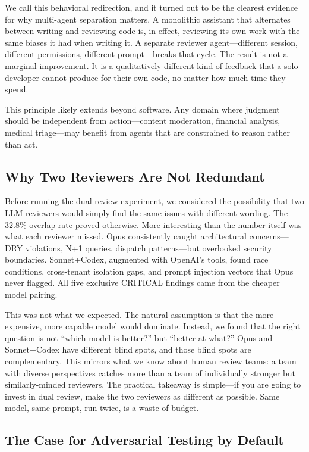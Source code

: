 \documentclass[11pt,a4paper]{article}
\begin{document}
We call this behavioral redirection, and it turned out to be the clearest evidence for why multi-agent separation matters. A monolithic assistant that alternates between writing and reviewing code is, in effect, reviewing its own work with the same biases it had when writing it. A separate reviewer agent---different session, different permissions, different prompt---breaks that cycle. The result is not a marginal improvement. It is a qualitatively different kind of feedback that a solo developer cannot produce for their own code, no matter how much time they spend.

This principle likely extends beyond software. Any domain where judgment should be independent from action---content moderation, financial analysis, medical triage---may benefit from agents that are constrained to reason rather than act.

\subsection{Why Two Reviewers Are Not Redundant}

Before running the dual-review experiment, we considered the possibility that two LLM reviewers would simply find the same issues with different wording. The 32.8\% overlap rate proved otherwise. More interesting than the number itself was what each reviewer missed. Opus consistently caught architectural concerns---DRY violations, N+1 queries, dispatch patterns---but overlooked security boundaries. Sonnet+Codex, augmented with OpenAI's tools, found race conditions, cross-tenant isolation gaps, and prompt injection vectors that Opus never flagged. All five exclusive CRITICAL findings came from the cheaper model pairing.

This was not what we expected. The natural assumption is that the more expensive, more capable model would dominate. Instead, we found that the right question is not ``which model is better?'' but ``better at what?'' Opus and Sonnet+Codex have different blind spots, and those blind spots are complementary. This mirrors what we know about human review teams: a team with diverse perspectives catches more than a team of individually stronger but similarly-minded reviewers. The practical takeaway is simple---if you are going to invest in dual review, make the two reviewers as different as possible. Same model, same prompt, run twice, is a waste of budget.

\subsection{The Case for Adversarial Testing by Default}
\end{document}
